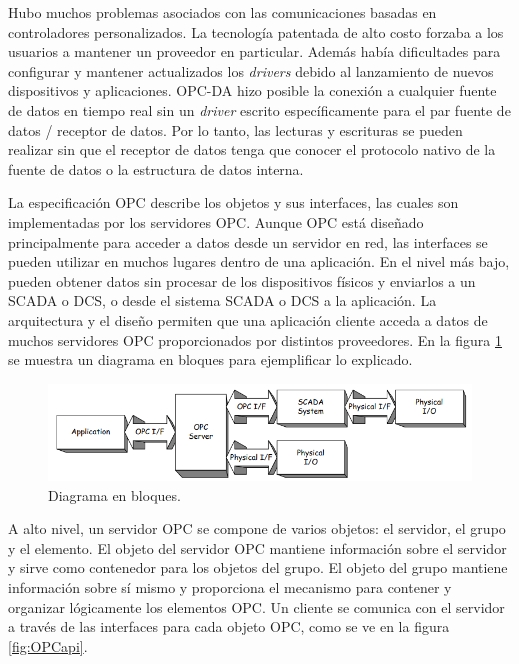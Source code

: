 \vspace{60px}

Hubo muchos problemas asociados con las comunicaciones basadas en controladores personalizados. La tecnología patentada de alto costo forzaba a los usuarios a mantener un proveedor en particular. Además había dificultades para configurar y  mantener actualizados los \textit{drivers} debido al lanzamiento de nuevos dispositivos y aplicaciones. OPC-DA hizo posible la conexión a cualquier fuente de datos en tiempo real sin un \textit{driver} escrito específicamente para el par fuente de datos / receptor de datos. Por lo tanto, las lecturas y escrituras se pueden realizar sin que el receptor de datos tenga que conocer el protocolo nativo de la fuente de datos o la estructura de datos interna.

La especificación OPC describe los objetos y sus interfaces, las cuales son implementadas por los servidores OPC. Aunque OPC está diseñado principalmente para acceder a datos desde un servidor en red, las interfaces se pueden utilizar en muchos lugares dentro de una aplicación. En el nivel más bajo, pueden obtener datos sin procesar de los dispositivos físicos y enviarlos a un SCADA o DCS, o desde el sistema SCADA o DCS a la aplicación. La arquitectura y el diseño permiten que una aplicación cliente acceda a datos de muchos servidores OPC proporcionados por distintos proveedores. En la figura \ref{fig:OPCbloques} se muestra un diagrama en bloques para ejemplificar lo explicado.

\begin{figure}[htpb]
	\centering
	\includegraphics[scale=0.45]{./Figures/opc_2.png}
	\caption{Diagrama en bloques\protect\footnotemark.}
	\label{fig:OPCbloques}
\end{figure}


A alto nivel, un servidor OPC se compone de varios objetos: el servidor, el grupo y el elemento. El objeto del servidor OPC mantiene información sobre el servidor y sirve como contenedor para los objetos del grupo. El objeto del grupo mantiene información sobre sí mismo y proporciona el mecanismo para contener y organizar lógicamente los elementos OPC. Un cliente se comunica con el servidor a través de las interfaces para cada objeto OPC, como se ve en la figura \ref{fig:OPCapi}.

